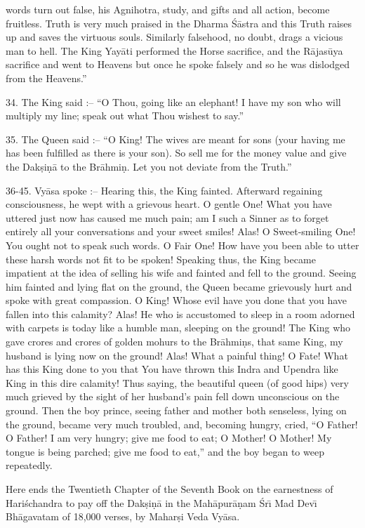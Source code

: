 words turn out false, his Agnihotra, study, and gifts and all action, become fruitless. Truth is very much praised in the Dharma \'S\=astra and this Truth raises up and saves the virtuous souls. Similarly falsehood, no doubt, drags a vicious man to hell. The King Yay\=ati performed the Horse sacrifice, and the R\=ajas\=uya sacrifice and went to Heavens but once he spoke falsely and so he was dislodged from the Heavens.''

34. The King said :-- ``O Thou, going like an elephant! I have my son who will multiply my line; speak out what Thou wishest to say.''

35. The Queen said :-- ``O King! The wives are meant for sons (your having me has been fulfilled as there is your son). So sell me for the money value and give the Dak\d{s}i\d{n}\=a to the Br\=ahmi\d{n}. Let you not deviate from the Truth.''

36-45. Vy\=asa spoke :-- Hearing this, the King fainted. Afterward regaining consciousness, he wept with a grievous heart. O gentle One! What you have uttered just now has caused me much pain; am I such a Sinner as to forget entirely all your conversations and your sweet smiles! Alas! O Sweet-smiling One! You ought not to speak such words. O Fair One! How have you been able to utter these harsh words not fit to be spoken! Speaking thus, the King became impatient at the idea of selling his wife and fainted and fell to the ground. Seeing him fainted and lying flat on the ground, the Queen became grievously hurt and spoke with great compassion. O King! Whose evil have you done that you have fallen into this calamity? Alas! He who is accustomed to sleep in a room adorned with carpets is today like a humble man, sleeping on the ground! The King who gave crores and crores of golden mohurs to the Br\=ahmi\d{n}s, that same King, my husband is lying now on the ground! Alas! What a painful thing! O Fate! What has this King done to you that You have thrown this Indra and Upendra like King in this dire calamity! Thus saying, the beautiful queen (of good hips) very much grieved by the sight of her husband's pain fell down unconscious on the ground. Then the boy prince, seeing father and mother both senseless, lying on the ground, became very much troubled, and, becoming hungry, cried, ``O Father! O Father! I am very hungry; give me food to eat; O Mother! O Mother! My tongue is being parched; give me food to eat,'' and the boy began to weep repeatedly.

Here ends the Twentieth Chapter of the Seventh Book on the earnestness of Hari\'schandra to pay off the Dak\d{s}i\d{n}\=a in the Mah\=apur\=a\d{n}am \'Sr\={\i} Mad Dev\={\i} Bh\=agavatam of 18,000 verses, by Mahar\d{s}i Veda Vy\=asa.



